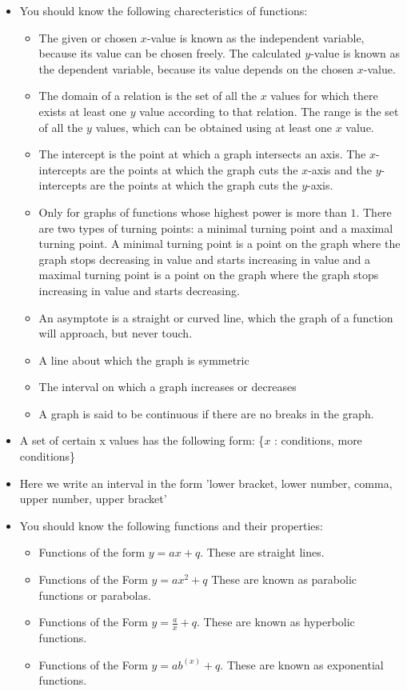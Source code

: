 \begin{itemize}[noitemsep]
\item You should know the following charecteristics of functions: 
\begin{itemize}[noitemsep]
\item The given or chosen $x$-value is known as the independent variable, because its value can be chosen freely. The calculated $y$-value is known as the dependent variable, because its value depends on the chosen $x$-value.
\item The domain of a relation is the set of all the $x$ values for which there exists at least one $y$ value according to that relation. The range is the set of all the $y$ values, which can be obtained using at least one $x$ value.
\item The intercept is the point at which a graph intersects an axis. The $x$-intercepts are the points at which the graph cuts the $x$-axis and the $y$-intercepts are the points at which the graph cuts the $y$-axis. 
\item Only for graphs of functions whose highest power is more than $1$. There are two types of turning points: a minimal turning point and a maximal turning point. A minimal turning point is a point on the graph where the graph stops decreasing in value and starts increasing in value and a maximal turning point is a point on the graph where the graph stops increasing in value and starts decreasing. 
\item An asymptote is a straight or curved line, which the graph of a function will approach, but never touch.
\item A line about which the graph is symmetric
\item  The interval on which a graph increases or decreases
\item A graph is said to be continuous if there are no breaks in the graph. 
\end{itemize}
\item 
A set of certain x values has the following form: \{$x$ : conditions, more conditions\}
\item 

Here we write an interval in the form 'lower bracket, lower number, comma, upper number, upper bracket'
\item  You should know the following functions and their properties:
    \begin{itemize}[noitemsep]
    \item Functions of the form $y=ax+q$. These are straight lines.
    \item Functions of the Form $y=a{x}^{2}+q$ These are known as parabolic functions or parabolas.
    \item Functions of the Form $y=\frac{a}{x}+q$. These are known as hyperbolic functions.
    \item Functions of the Form $y=a{b}^{(x)}+q$. These are known as exponential functions.
    \end{itemize}
\end{itemize}

